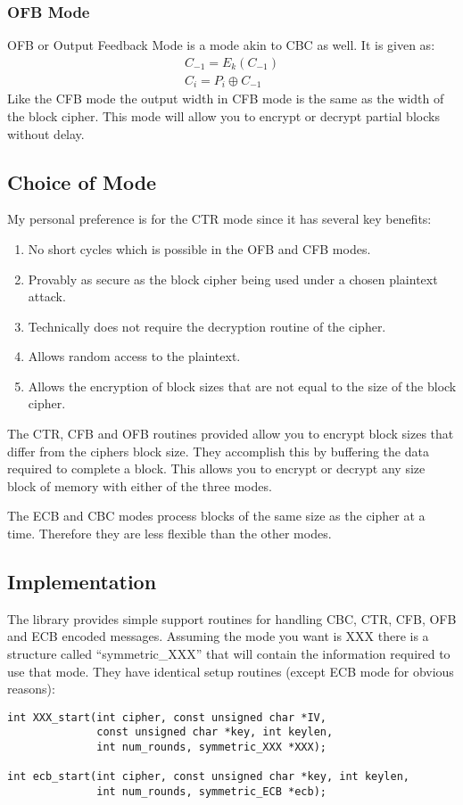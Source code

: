 \documentclass{book}
\begin{document}
\subsubsection{OFB Mode}
OFB or Output Feedback Mode is a mode akin to CBC as well.  It is given as:
\begin{eqnarray}
C_{-1} = E_k(C_{-1}) \nonumber \\
C_i = P_i \oplus C_{-1}
\end{eqnarray}
Like the CFB mode the output width in CFB mode is the same as the width of the block cipher.  This mode will allow you to
encrypt or decrypt partial blocks without delay.

\subsection{Choice of Mode}
My personal preference is for the CTR mode since it has several key benefits:
\begin{enumerate}
   \item No short cycles which is possible in the OFB and CFB modes.
   \item Provably as secure as the block cipher being used under a chosen plaintext attack.
   \item Technically does not require the decryption routine of the cipher.
   \item Allows random access to the plaintext.
   \item Allows the encryption of block sizes that are not equal to the size of the block cipher.
\end{enumerate}
The CTR, CFB and OFB routines provided allow you to encrypt block sizes that differ from the ciphers block size.  They 
accomplish this by buffering the data required to complete a block.  This allows you to encrypt or decrypt any size 
block of memory with either of the three modes.

The ECB and CBC modes process blocks of the same size as the cipher at a time.  Therefore they are less flexible than the
other modes.

\subsection{Implementation}
 
 
The library provides simple support routines for handling CBC, CTR, CFB, OFB and ECB encoded messages.  Assuming the mode 
you want is XXX there is a structure called ``symmetric\_XXX'' that will contain the information required to
use that mode.  They have identical setup routines (except ECB mode for obvious reasons):
\begin{verbatim}
int XXX_start(int cipher, const unsigned char *IV, 
              const unsigned char *key, int keylen, 
              int num_rounds, symmetric_XXX *XXX);

int ecb_start(int cipher, const unsigned char *key, int keylen, 
              int num_rounds, symmetric_ECB *ecb);
\end{verbatim}
\end{document}
